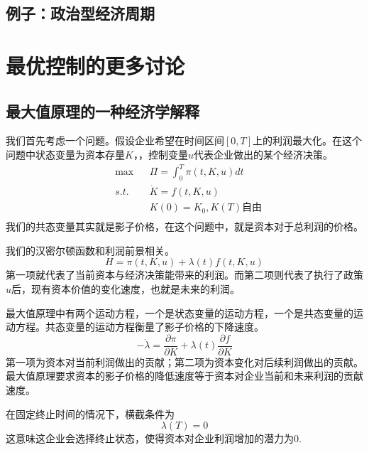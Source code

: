 \documentclass[UTF8,12pt]{ctexart}
\numberwithin{equation}{section} %
\numberwithin{figure}{section}
\numberwithin{table}{section}
\begin{document}
	\subsection{例子：政治型经济周期}
	
	
	\newpage
	
	\section{最优控制的更多讨论}
	
	\subsection{最大值原理的一种经济学解释}
	我们首先考虑一个问题。假设企业希望在时间区间$[0,T]$上的利润最大化。在这个问题中状态变量为资本存量$K$，，控制变量$u$代表企业做出的某个经济决策。
	\begin{equation}
		\begin{aligned}
			&\max &&\Pi = \int_{0}^{T}\pi(t,K,u)dt \\
			&s.t. &&\dot{K} = f(t,K,u)  \\
			&  &&K(0) = K_0,K(T)\text{自由} \\ 
		\end{aligned}
	\end{equation}
	我们的共态变量其实就是影子价格，在这个问题中，就是资本对于总利润的价格。
	
	我们的汉密尔顿函数和利润前景相关。
	\begin{equation}
		H = \pi(t,K,u) + \lambda(t)f(t,K,u)
	\end{equation}
	第一项就代表了当前资本与经济决策能带来的利润。而第二项则代表了执行了政策$u$后，现有资本价值的变化速度，也就是未来的利润。
	
	最大值原理中有两个运动方程，一个是状态变量的运动方程，一个是共态变量的运动方程。共态变量的运动方程衡量了影子价格的下降速度。
	\begin{equation}
		- \dot{\lambda} = \frac{\partial \pi}{\partial K} + \lambda(t)\frac{\partial f}{\partial K}
	\end{equation}
	第一项为资本对当前利润做出的贡献；第二项为资本变化对后续利润做出的贡献。最大值原理要求资本的影子价格的降低速度等于资本对企业当前和未来利润的贡献速度。
	
	在固定终止时间的情况下，横截条件为
	\begin{equation}
		\lambda(T) = 0
	\end{equation}
	这意味这企业会选择终止状态，使得资本对企业利润增加的潜力为0.
	
\end{document}
